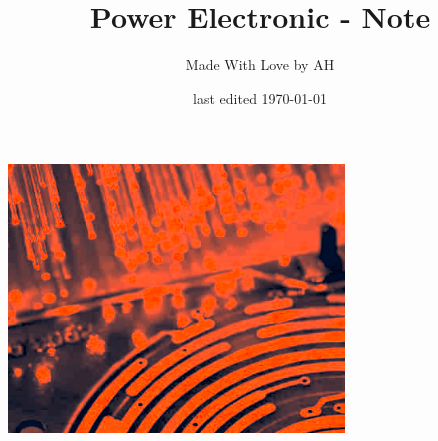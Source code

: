 \documentclass{article}
\title{Power Electronic - Note}
\author{Made With Love by AH}
\date{last edited \today}
\begin{document}

\makeatletter
    \begin{titlepage}
        \begin{center}
            \includegraphics[width=0.7\linewidth]{logo.png}\\[4ex]
            {\huge \bfseries  \@title }\\[2ex] 
            {\LARGE  \@author}\\[50ex] 
            {\large \@date}
        \end{center}
    \end{titlepage}
\makeatother

\maketitle
\tableofcontents
\pagebreak


\end{document}
